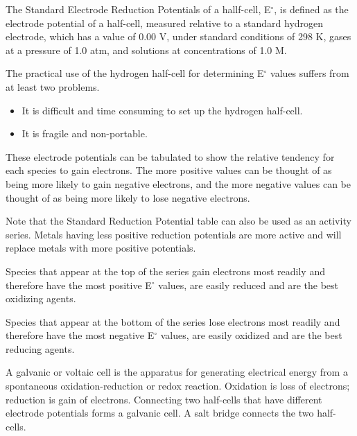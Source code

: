 \documentclass[../chem.tex]{subfiles}
\begin{document}
The Standard Electrode Reduction Potentials of a hallf-cell, E$^{\circ}$, is defined as the electrode potential of a half-cell, measured relative 
to a standard hydrogen electrode, which has a value of 0.00 V, under standard conditions of 298 K, gases at a pressure of 1.0 atm, and solutions at concentrations of 1.0 M.

The practical use of the hydrogen half-cell for determining E$^{\circ}$ values suffers from at least two problems.
\begin{itemize}
    \item It is difficult and time consuming to set up the hydrogen half-cell.
    \item It is fragile and non-portable.
\end{itemize}

These electrode potentials can be tabulated to show the relative tendency for each species to gain electrons. The more positive values can be thought 
of as being more likely to gain negative electrons, and the more negative values can be thought of as being more likely to lose negative electrons.

Note that the Standard Reduction Potential table can also be used as an activity series. Metals having less positive reduction potentials are more active and will replace metals with more positive potentials.

Species that appear at the top of the series gain electrons most readily and therefore have the most positive E$^{\circ}$ values, are easily reduced and are the best oxidizing agents.

Species that appear at the bottom of the series lose electrons most readily and therefore have the most negative E$^{\circ}$ values, are easily oxidized and are the best reducing agents.

A galvanic or voltaic cell is the apparatus for generating electrical energy from a spontaneous oxidation-reduction or redox reaction. Oxidation is loss of electrons;
reduction is gain of electrons. Connecting two half-cells that have different electrode potentials forms a galvanic cell. A salt bridge connects the two half-cells.
\end{document}
